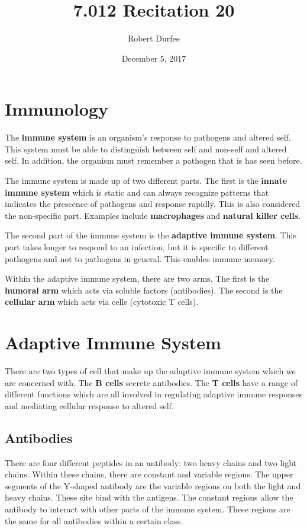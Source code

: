 \documentclass{article}
\title{ 7.012 Recitation 20 }
\author{ Robert Durfee }
\date{ December 5, 2017 }
\begin{document}
\maketitle

\section{ Immunology }

The \textbf{immune system} is an organism's response to pathogens and altered
self. This system must be able to distinguish between self and non-self and
altered self. In addition, the organism must remember a pathogen that is has
seen before. 

The immune system is made up of two different parts. The first is the
\textbf{innate immune system} which is static and can always recognize patterns
that indicates the prescence of pathogens and response rapidly. This is also
considered the non-specific part. Examples include \textbf{macrophages} and 
\textbf{natural killer cells}.

The second part of the immune system is the \textbf{adaptive immune system}.
This part takes longer to respond to an infection, but it is specific to
different pathogens and not to pathogens in general. This enables immune memory. 

Within the adaptive immune system, there are two arms. The first is the
\textbf{humoral arm} which acts via soluble factors (antibodies). The second is
the \textbf{cellular arm} which acts via cells (cytotoxic T cells).

\section{ Adaptive Immune System }

There are two types of cell that make up the adaptive immune system which we are
concerned with. The \textbf{B cells} secrete antibodies. The \textbf{T cells}
have a range of different functions which are all involved in regulating
adaptive immune responses and mediating cellular response to altered self.

\subsection{ Antibodies }

There are four different peptides in an antibody: two heavy chains and two light
chains. Within these chains, there are constant and variable regions. The upper
segments of the Y-shaped antibody are the variable regions on both the light and
heavy chains. These site bind with the antigens. The constant regions allow the
antibody to interact with other parts of the immune system. These regions are
the same for all antibodies within a certain class.
\end{document}
